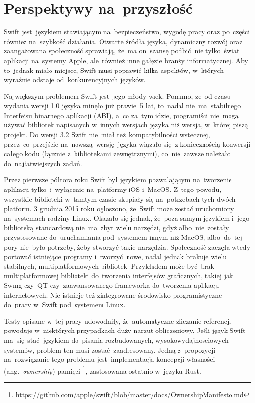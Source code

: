 \documentclass[mgr, shortabstract]{iithesis}
\newcommand{\ang}[1]{ang.~\textit{#1}}
\begin{document}
\section{Perspektywy na~przyszłość}

Swift jest~językiem stawiającym na~bezpieczeństwo, wygodę pracy oraz po~części również na~szybkość działania. Otwarte źródła języka, dynamiczny rozwój oraz zaangażowana społeczność sprawiają, że~ma on~szansę podbić nie tylko~świat aplikacji na~systemy Apple, ale~również inne gałęzie branży informatycznej. Aby to~jednak miało miejsce, Swift musi poprawić kilka aspektów, w~których wyraźnie odstaje od~konkurencyjnych języków.

Największym problemem Swift jest~jego młody wiek. Pomimo, że~od czasu wydania wersji 1.0 języka minęło już prawie 5 lat, to~nadal nie~ma~stabilnego Interfejsu binarnego aplikacji (ABI), a~co za~tym idzie, programiści nie~mogą używać bibliotek napisanych w~innych wersjach języka niż wersja, w~której piszą projekt. Do wersji 3.2 Swift nie~miał też kompatybilności wstecznej, przez~co~przejście na~nowszą wersję języka wiązało się z koniecznością konwersji całego kodu (łącznie z~bibliotekami zewnętrznymi), co~nie~zawsze należało do~najłatwiejszych zadań.

Przez pierwsze półtora roku Swift był językiem pozwalającym na~tworzenie aplikacji tylko~i~wyłącznie na~platformy iOS i~MacOS. Z~tego powodu, wszystkie biblioteki w~tamtym czasie skupiały się na~potrzebach tych dwóch platform. 3 grudnia 2015 roku ogłoszono, że~Swift może zostać uruchomiony na~systemach rodziny Linux. Okazało się jednak, że~poza samym językiem i~jego biblioteką standardową nie~ma~zbyt wielu narzędzi, gdyż albo~nie~zostały przystosowane do~uruchamiania pod~systemem innym niż MacOS, albo~do~tej pory nie~było potrzeby, żeby stworzyć takie narzędzia. Społeczność zaczęła wtedy portować istniejące programy i~tworzyć nowe, nadal jednak brakuje wielu stabilnych, multiplatformowych bibliotek. Przykładem może być brak multiplatformowej biblioteki do~tworzenia interfejsów graficznych, takiej jak Swing czy~QT czy~zaawansowanego frameworka do~tworzenia aplikacji internetowych. Nie istnieje też zintegrowane środowisko programistyczne do~pracy w~Swift pod~systemem Linux.

Testy opisane w~tej pracy udowodniły, że~automatyczne zliczanie referencji powoduje w~niektórych przypadkach duży narzut obliczeniowy. Jeśli język Swift ma~się stać językiem do~pisania rozbudowanych, wysokowydajnościowych systemów, problem ten musi zostać zaadresowany. Jedną z~propozycji na~rozwiązanie tego problemu jest~implementacja koncepcji własności (\ang{ownership}) pamięci \footnote{https://github.com/apple/swift/blob/master/docs/OwnershipManifesto.md}, zastosowana ostatnio w~języku Rust. 
\end{document}
